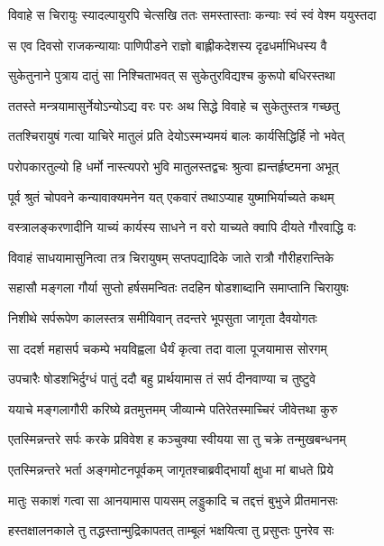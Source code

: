 \twolineshloka
{विवाहे स चिरायुः स्यादल्पायुरपि चेत्सखि}
{ततः समस्तास्ताः कन्याः स्वं स्वं वेश्म ययुस्तदा} %

\twolineshloka
{स एव दिवसो राजकन्यायाः पाणिपीडने}
{राज्ञो बाह्लीकदेशस्य दृढधर्माभिधस्य वै} %

\twolineshloka
{सुकेतुनाने पुत्राय दातुं सा निश्चिताभवत्}
{स सुकेतुरविद्यश्च कुरूपो बधिरस्तथा} %

\twolineshloka
{ततस्ते मन्त्रयामासुर्नेयोऽन्योऽद्य वरः परः}
{अथ सिद्धे विवाहे च सुकेतुस्तत्र गच्छतु} %

\twolineshloka
{ततश्चिरायुषं गत्वा याचिरे मातुलं प्रति}
{देयोऽस्मभ्यमयं बालः कार्यसिद्धिर्हि नो भवेत्} %

\twolineshloka
{परोपकारतुल्यो हि धर्मो नास्त्यपरो भुवि}
{मातुलस्तद्वचः श्रुत्वा ह्यन्तर्हृष्टमना अभूत्} %

\twolineshloka
{पूर्व श्रुतं चोपवने कन्यावाक्यमनेन यत्}
{एकवारं तथाऽप्याह युष्माभिर्याच्यते कथम्} %

\twolineshloka
{वस्त्रालङ्करणादीनि याच्यं कार्यस्य साधने}
{न वरो याच्यते क्वापि दीयते गौरवाद्धि वः} %

\twolineshloka
{विवाहं साधयामासुनित्वा तत्र चिरायुषम्}
{सप्तपद्यादिके जाते रात्रौ गौरीहरान्तिके} %

\twolineshloka
{सहासौ मङ्गला गौर्या सुप्तो हर्षसमन्वितः}
{तदहिन षोडशाब्दानि समाप्तानि चिरायुषः} %

\twolineshloka
{निशीथे सर्परूपेण कालस्तत्र समीयिवान्}
{तदन्तरे भूपसुता जागृता दैवयोगतः} %

\twolineshloka
{सा ददर्श महासर्प चकम्पे भयविह्वला}
{धैर्यं कृत्वा तदा वाला पूजयामास सोरगम्} %

\twolineshloka
{उपचारैः षोडशभिर्दुग्धं पातुं ददौ बहु}
{प्रार्थयामास तं सर्प दीनवाण्या च तुष्टुवे} %

\twolineshloka
{ययाचे मङ्गलागौरी करिष्ये व्रतमुत्तमम्}
{जीव्यान्मे पतिरेतस्माच्चिरं जीवेत्तथा कुरु} %

\twolineshloka
{एतस्मिन्नन्तरे सर्पः करके प्रविवेश ह}
{कञ्चुक्या स्वीयया सा तु चक्रे तन्मुखबन्धनम्} %

\twolineshloka
{एतस्मिन्नन्तरे भर्ता अङ्गमोटनपूर्वकम्}
{जागृतश्चाब्रवीद्भार्यां क्षुधा मां बाधते प्रिये} %

\twolineshloka
{मातुः सकाशं गत्वा सा आनयामास पायसम्}
{लड्डुकादि च तद्दत्तं बुभुजे प्रीतमानसः} %

\twolineshloka
{हस्तक्षालनकाले तु तद्धस्तान्मुद्रिकापतत्}
{ताम्बूलं भक्षयित्वा तु प्रसुप्तः पुनरेव सः} %

